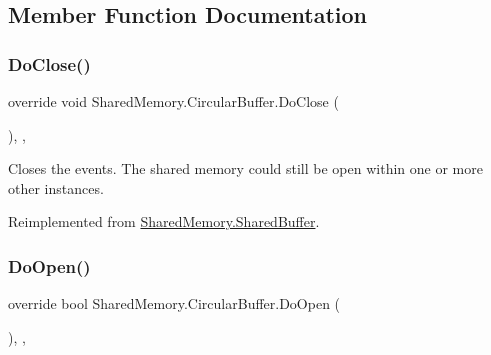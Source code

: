 \subsection{Member Function Documentation}
\mbox{\label{class_shared_memory_1_1_circular_buffer_a29c1e46f0d8a3b95c83a361ac7f84194}} 
\subsubsection{\texorpdfstring{Do\+Close()}{DoClose()}}
{\footnotesize\ttfamily override void Shared\+Memory.\+Circular\+Buffer.\+Do\+Close (\begin{DoxyParamCaption}{ }\end{DoxyParamCaption})\hspace{0.3cm}{\ttfamily [inline]}, {\ttfamily [protected]}, {\ttfamily [virtual]}}



Closes the events. The shared memory could still be open within one or more other instances. 



Reimplemented from \hyperlink{class_shared_memory_1_1_shared_buffer_a2137a67b3309712bc1e9a540c919f9bc}{Shared\+Memory.\+Shared\+Buffer}.

\mbox{\label{class_shared_memory_1_1_circular_buffer_aff62bc6b9dbca60658ab979762dd073d}} 
\subsubsection{\texorpdfstring{Do\+Open()}{DoOpen()}}
{\footnotesize\ttfamily override bool Shared\+Memory.\+Circular\+Buffer.\+Do\+Open (\begin{DoxyParamCaption}{ }\end{DoxyParamCaption})\hspace{0.3cm}{\ttfamily [inline]}, {\ttfamily [protected]}, {\ttfamily [virtual]}}



